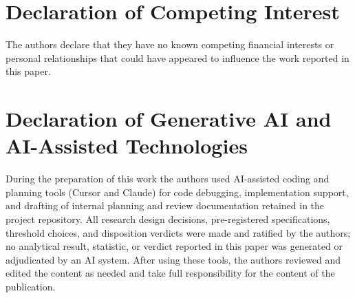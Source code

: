 \documentclass[3p]{elsarticle}
\begin{document}
\section*{Declaration of Competing Interest}

The authors declare that they have no known competing financial interests or
personal relationships that could have appeared to influence the work reported
in this paper.

\section*{Declaration of Generative AI and AI-Assisted Technologies}

During the preparation of this work the authors used AI-assisted coding and
planning tools (Cursor and Claude) for code debugging, implementation
support, and drafting of internal planning and review documentation retained
in the project repository. All research design decisions, pre-registered
specifications, threshold choices, and disposition verdicts were made and
ratified by the authors; no analytical result, statistic, or verdict reported
in this paper was generated or adjudicated by an AI system. After using these
tools, the authors reviewed and edited the content as needed and take full
responsibility for the content of the publication.


\end{document}

